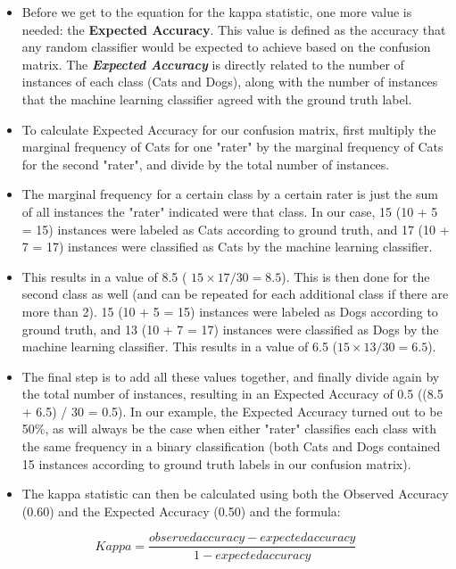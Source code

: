 \documentclass[caret-main.tex]{subfiles}
\begin{document}
\begin{itemize}
\item Before we get to the equation for the kappa statistic, one more value is needed: the \textbf{Expected Accuracy}. This value is defined as the accuracy that any random classifier would be expected to achieve based on the confusion matrix. The \textbf{\textit{Expected Accuracy}} is directly related to the number of instances of each class (Cats and Dogs), along with the number of instances that the machine learning classifier agreed with the ground truth label. 
\item To calculate Expected Accuracy for our confusion matrix, first multiply the marginal frequency of Cats for one "rater" by the marginal frequency of Cats for the second "rater", and divide by the total number of instances. \item The marginal frequency for a certain class by a certain rater is just the sum of all instances the "rater" indicated were that class. In our case, 15 (10 + 5 = 15) instances were labeled as Cats according to ground truth, and 17 (10 + 7 = 17) instances were classified as Cats by the machine learning classifier.
\item  This results in a value of 8.5 ( $15 \times 17 / 30 = 8.5$). This is then done for the second class as well (and can be repeated for each additional class if there are more than 2). 15 (10 + 5 = 15) instances were labeled as Dogs according to ground truth, and 13 (10 + 7 = 17) instances were classified as Dogs by the machine learning classifier. This results in a value of 6.5 ($15 \times 13 / 30 = 6.5$). 
\item The final step is to add all these values together, and finally divide again by the total number of instances, resulting in an Expected Accuracy of 0.5 ((8.5 + 6.5) / 30 = 0.5). In our example, the Expected Accuracy turned out to be 50\%, as will always be the case when either "rater" classifies each class with the same frequency in a binary classification (both Cats and Dogs contained 15 instances according to ground truth labels in our confusion matrix).
\item 
The kappa statistic can then be calculated using both the Observed Accuracy (0.60) and the Expected Accuracy (0.50) and the formula:
\end{itemize}
\[Kappa = \frac{observed accuracy - expected accuracy}{1 - expected accuracy}\]

\end{document}

